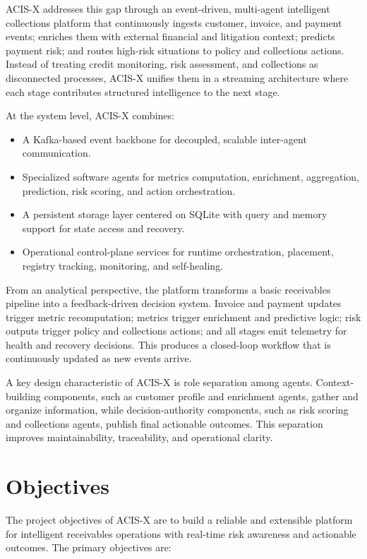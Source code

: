 \documentclass[a4paper, 12pt]{report}
\begin{document}
ACIS-X addresses this gap through an event-driven, multi-agent intelligent collections platform that continuously ingests customer, invoice, and payment events; enriches them with external financial and litigation context; predicts payment risk; and routes high-risk situations to policy and collections actions. Instead of treating credit monitoring, risk assessment, and collections as disconnected processes, ACIS-X unifies them in a streaming architecture where each stage contributes structured intelligence to the next stage.

At the system level, ACIS-X combines:
\begin{itemize}[itemsep=2pt]
    \item A Kafka-based event backbone for decoupled, scalable inter-agent communication.
    \item Specialized software agents for metrics computation, enrichment, aggregation, prediction, risk scoring, and action orchestration.
    \item A persistent storage layer centered on SQLite with query and memory support for state access and recovery.
    \item Operational control-plane services for runtime orchestration, placement, registry tracking, monitoring, and self-healing.
\end{itemize}

From an analytical perspective, the platform transforms a basic receivables pipeline into a feedback-driven decision system. Invoice and payment updates trigger metric recomputation; metrics trigger enrichment and predictive logic; risk outputs trigger policy and collections actions; and all stages emit telemetry for health and recovery decisions. This produces a closed-loop workflow that is continuously updated as new events arrive.

A key design characteristic of ACIS-X is role separation among agents. Context-building components, such as customer profile and enrichment agents, gather and organize information, while decision-authority components, such as risk scoring and collections agents, publish final actionable outcomes. This separation improves maintainability, traceability, and operational clarity.

\section{Objectives}
The project objectives of ACIS-X are to build a reliable and extensible platform for intelligent receivables operations with real-time risk awareness and actionable outcomes. The primary objectives are:
\end{document}
